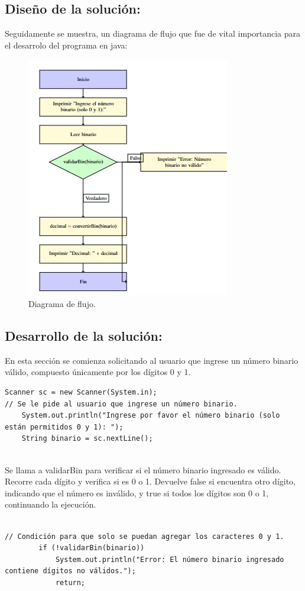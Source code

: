 \subsection{\textbf{Diseño de la solución:}}
Seguidamente se muestra, un diagrama de flujo que fue de vital importancia para el desarrolo del programa en java:
\begin{figure}[h!]
    \centering
    \includegraphics[width = 7.5 cm]{LaTeX/latex-imagenes/fig.1.jpeg}
    \caption{Diagrama de flujo.}
    \label{fig:Diagrama de flujo que se uso para la creación del codigo en java.}
\end{figure}
\subsection{\textbf{Desarrollo de la solución:}}
En esta sección se comienza solicitando al usuario que ingrese un número binario válido, compuesto únicamente por los dígitos 0 y 1.

\begin{lstlisting}[style=javaStyle]
        Scanner sc = new Scanner(System.in);
// Se le pide al usuario que ingrese un número binario.
    System.out.println("Ingrese por favor el número binario (solo están permitidos 0 y 1): ");
    String binario = sc.nextLine();
  
\end{lstlisting}
Se llama a validarBin para verificar si el número binario ingresado es válido. Recorre cada dígito y verifica si es 0 o 1. Devuelve false si encuentra otro dígito, indicando que el número es inválido, y true si todos los dígitos son 0 o 1, continuando la ejecución.
\begin{lstlisting}[style=javaStyle] 
    
// Condición para que solo se puedan agregar los caracteres 0 y 1.
        if (!validarBin(binario)) 
            System.out.println("Error: El número binario ingresado contiene dígitos no válidos.");
            return;
     
\end{lstlisting}

